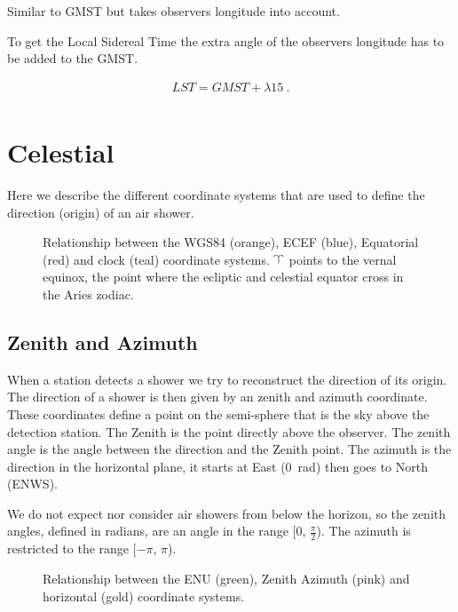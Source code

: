 Similar to GMST but takes observers longitude into account.

To get the Local Sidereal Time the extra angle of the observers
longitude has to be added to the GMST.

\begin{equation}
    \begin{array}{l}
        \mathit{LST} = \mathit{GMST} + \lambda 15 \ . \\
    \end{array}
\end{equation}

\section{Celestial}

Here we describe the different coordinate systems that are used to
define the direction (origin) of an air shower.

\begin{figure}
    \centering
    
    \caption{Relationship between the WGS84 (orange), ECEF (blue),
             Equatorial (red) and clock (teal) coordinate systems.
             $\vernal$ points to the vernal equinox, the point where the
             ecliptic and celestial equator cross in the Aries zodiac.}
    \label{fig:wgs84_equatorial}
\end{figure}


\subsection{Zenith and Azimuth}

When a station detects a shower we try to reconstruct the direction of
its origin. The direction of a shower is then given by an zenith and
azimuth coordinate. These coordinates define a point on the semi-sphere
that is the sky above the detection station. The Zenith is the point
directly above the observer. The zenith angle is the angle between the
direction and the Zenith point. The azimuth is the direction in the
horizontal plane, it starts at East (\SI{0}{\radian}) then goes to North
(ENWS).

We do not expect nor consider air showers from below the horizon, so the
zenith angles, defined in radians, are an angle in the range [0,
$\frac{\pi}{2}$). The azimuth is restricted to the range [$-\pi$, $\pi$).

\begin{figure}
    \centering
    
    \caption{Relationship between the ENU (green), Zenith Azimuth (pink)
             and horizontal (gold) coordinate systems.}
    \label{fig:enu_horizontal}
\end{figure}


